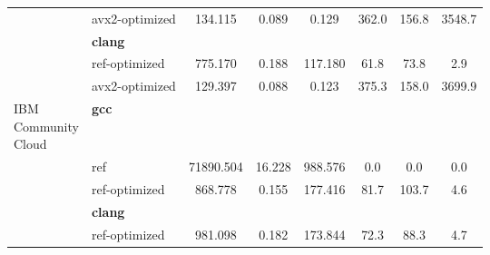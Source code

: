 \begin{table}
\begin{tabularx}{\linewidth}{l l c c c c c c}
          & avx2-optimized & 134.115 & 0.089 & 0.129 & 362.0 & 156.8 & 3548.7\\
          & \textbf{clang} & & & & & \\
          & ref-optimized & 775.170 & 0.188 & 117.180 & 61.8 & 73.8 & 2.9\\
          & avx2-optimized & 129.397 & 0.088 & 0.123 & 375.3 & 158.0 & 3699.9\\
          \midrule
          \multirowcell{5}{IBM\\ Community\\ Cloud}
          & \textbf{gcc} & & & & & \\
          & ref & 71890.504 & 16.228 & 988.576 & 0.0 & 0.0 & 0.0\\
          & ref-optimized & 868.778 & 0.155 & 177.416 & 81.7 & 103.7 & 4.6\\
          & \textbf{clang} & & & & & \\
          & ref-optimized & 981.098 & 0.182 & 173.844 & 72.3 & 88.3 & 4.7\\
        \bottomrule
    \end{tabularx}
\end{table}